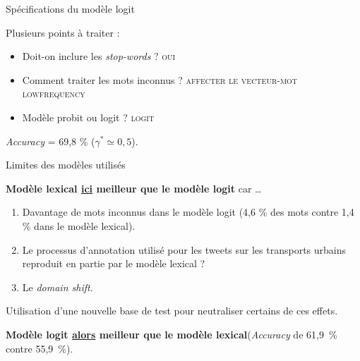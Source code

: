 \documentclass[10pt,xcolor=table,color={dvipsnames,usenames},ignorenonframetext,usepdftitle=false,french]{beamer}
\providecommand{\tightlist}{%
  \setlength{\parskip}{0pt}
  }
\begin{document}
\begin{frame}{Spécifications du modèle logit}
\protect\hypertarget{spuxe9cifications-du-moduxe8le-logit}{}

Plusieurs points à traiter :

\begin{itemize}
\item
  Doit-on inclure les \emph{stop-words} ? \textsc{oui}
\item
  Comment traiter les mots inconnus ?
  \textsc{affecter le vecteur-mot lowfrequency}
\item
  Modèle probit ou logit ? \textsc{logit}
\end{itemize}

\bigskip

\bigskip

\faArrowCircleRight{} \emph{Accuracy} = 69,8 \%
(\(\gamma^* \simeq 0,5\)).

\end{frame}

\begin{frame}{Limites des modèles utilisés}
\protect\hypertarget{limites-des-moduxe8les-utilisuxe9s}{}

\textbf{Modèle lexical \underline{ici} meilleur que le modèle logit} car
\dots

\begin{enumerate}
\tightlist
\item
  Davantage de mots inconnus dans le modèle logit (4,6 \% des mots
  contre 1,4 \% dans le modèle lexical).
\end{enumerate}

\pause

\begin{enumerate}
\setcounter{enumi}{1}
\tightlist
\item
  Le processus d'annotation utilisé pour les tweets sur les transports
  urbains reproduit en partie par le modèle lexical ?
\end{enumerate}

\pause

\begin{enumerate}
\setcounter{enumi}{2}
\tightlist
\item
  Le \emph{domain shift}.
\end{enumerate}

\pause

\bigskip

\faArrowCircleRight{} Utilisation d'une nouvelle base de test pour
neutraliser certains de ces effets.

\textbf{Modèle logit \underline{alors} meilleur que le modèle
lexical}\newline(\emph{Accuracy} de 61,9~\% contre 55,9~\%).

\end{frame}
\end{document}
